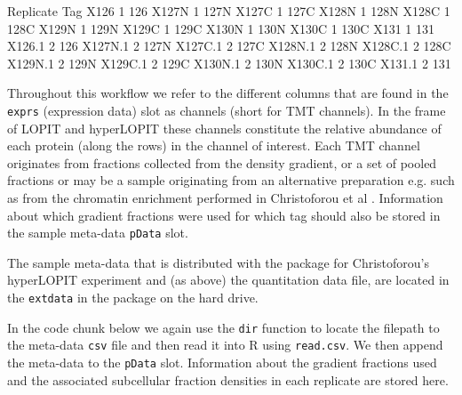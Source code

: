 \begin{Schunk}
\begin{Soutput}
        Replicate  Tag
X126            1  126
X127N           1 127N
X127C           1 127C
X128N           1 128N
X128C           1 128C
X129N           1 129N
X129C           1 129C
X130N           1 130N
X130C           1 130C
X131            1  131
X126.1          2  126
X127N.1         2 127N
X127C.1         2 127C
X128N.1         2 128N
X128C.1         2 128C
X129N.1         2 129N
X129C.1         2 129C
X130N.1         2 130N
X130C.1         2 130C
X131.1          2  131
\end{Soutput}
\end{Schunk}

Throughout this workflow we refer to the different columns that
are found in the \texttt{exprs} (expression data) slot as channels (short for TMT channels).
In the frame of LOPIT and hyperLOPIT these channels constitute the
relative abundance of each protein (along the rows) in the channel of
interest. Each TMT channel originates from fractions collected from
the density gradient, or a set of pooled fractions or may be a sample
originating from an alternative preparation e.g. such as from the
chromatin enrichment performed in Christoforou et al \cite{hyper}.
Information about which gradient fractions were used for which tag
should also be stored in the sample meta-data \texttt{pData} slot.

The sample meta-data that is distributed with the
 package for Christoforou's
hyperLOPIT experiment and (as above) the quantitation data file, are
located in the \texttt{extdata} in the 
package on the hard drive.

In the code chunk below we again use the
\texttt{dir} function to locate the filepath to the meta-data \texttt{csv} file and
then read it into R using \texttt{read.csv}. We then append the meta-data to
the \texttt{pData} slot.  Information about the gradient fractions used and
the associated subcellular fraction densities in %
each replicate are stored here.

